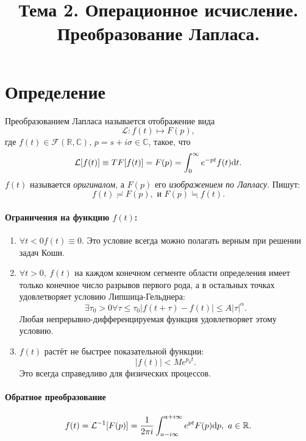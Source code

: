 \documentclass[12pt]{report}
\title{Тема 2. Операционное исчисление. Преобразование Лапласа.}
\renewcommand{\L}{\mathcal L}
\newcommand{\F}{\mathcal F}
\newcommand{\R}{\mathbb R}
\renewcommand{\C}{\mathbb C}
\renewcommand{\i}{i}
\begin{document}
	\maketitle
	\tableofcontents
	
	
\section{Определение}
Преобразованием Лапласа называется отображение вида~\cite{Dubkov:Lecture}
\[
\L : f(t) \mapsto F(p),
\]
где $f(t) \in \F(\R, \C)$, $p = s + \i\sigma \in \C$, такое, что
\[
\L[f(t)]\equiv TF[f(t)] = F(p) = \int_{0}^{\infty} e^{-pt}f(t)\rd t.
\]
$f(t)$ называется \emph{оригиналом}, а $F(p)$ его \emph{изображением по Лапласу}. Пишут:
\[
f(t) \risingdotseq F(p), \text{ и } F(p) \fallingdotseq f(t). 
\]
\paragraph{Ограничения на функцию $f(t)$:}
\begin{enumerate}
	\item $\forall t < 0f(t) \equiv 0$. Это условие всегда можно полагать верным при решении задач Коши.
	\item $\forall t > 0,~ f(t)$ на каждом конечном сегменте области определения имеет только конечное число разрывов первого рода, а в остальных точках удовлетворяет условию Липшица-Гельднера: 
	\[\exists\tau_0>0\forall \tau \leq \tau_0 |f(t+\tau) - f(t)| \leq A|\tau|^\alpha.\]
	Любая непрерывно-дифференцируемая функция удовлетворяет этому условию.
	\item $f(t)$ растёт не быстрее показательной функции: \[ |f(t)| < Me^{p_0t}.\] Это всегда справедливо для физических процессов.
\end{enumerate}

\paragraph{Обратное преобразование}
\[
f(t) = \L^{-1}[F(p)] = \frac{1}{2\pi\i}\int_{a - \i\infty}^{a+\i\infty}e^{pt}F(p)\rd p, ~ a\in\R.
\]
\end{document}
